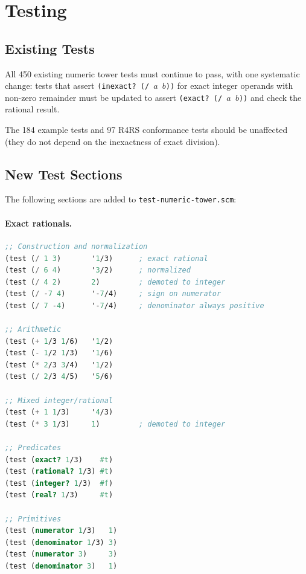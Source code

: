 \documentclass[12pt]{article}
\begin{document}
\section{Testing}
\label{sec:testing}

\subsection{Existing Tests}

All 450 existing numeric tower tests must continue to pass, with
one systematic change: tests that assert {\tt (inexact? (/ $a$ $b$))}
for exact integer operands with non-zero remainder must be updated
to assert {\tt (exact? (/ $a$ $b$))} and check the rational result.

The 184 example tests and 97 R4RS conformance tests should be
unaffected (they do not depend on the inexactness of exact division).

\subsection{New Test Sections}

The following sections are added to {\tt test-numeric-tower.scm}:

\paragraph{Exact rationals.}
\begin{lstlisting}[language=Scheme]
;; Construction and normalization
(test (/ 1 3)       '1/3)      ; exact rational
(test (/ 6 4)       '3/2)      ; normalized
(test (/ 4 2)       2)         ; demoted to integer
(test (/ -7 4)      '-7/4)     ; sign on numerator
(test (/ 7 -4)      '-7/4)     ; denominator always positive

;; Arithmetic
(test (+ 1/3 1/6)   '1/2)
(test (- 1/2 1/3)   '1/6)
(test (* 2/3 3/4)   '1/2)
(test (/ 2/3 4/5)   '5/6)

;; Mixed integer/rational
(test (+ 1 1/3)     '4/3)
(test (* 3 1/3)     1)         ; demoted to integer

;; Predicates
(test (exact? 1/3)    #t)
(test (rational? 1/3) #t)
(test (integer? 1/3)  #f)
(test (real? 1/3)     #t)

;; Primitives
(test (numerator 1/3)   1)
(test (denominator 1/3) 3)
(test (numerator 3)     3)
(test (denominator 3)   1)
\end{lstlisting}
\end{document}

